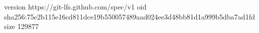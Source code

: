version https://git-lfs.github.com/spec/v1
oid sha256:75e2b115e16cd811dce19b550057489aad024ee3d48bb81d1a999b5dba7ad1fd
size 129877
